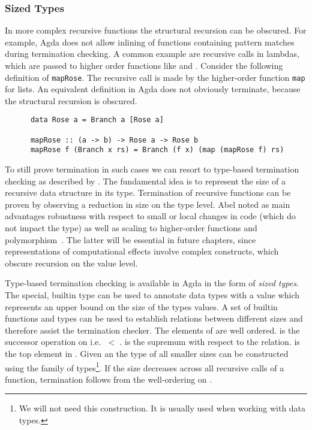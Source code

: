\subsubsection{Sized Types}
\label{preliminaries:sized-types}

In more complex recursive functions the structural recursion can be obscured.
For example, Agda does not allow inlining of functions containing pattern
matches during termination checking.
A common example are recursive calls in lambdas, which are passed to higher
order functions like  and \AgdaFunction{>>=}.
Consider the following definition of \texttt{mapRose}.
The recursive call is made by the higher-order function
\texttt{map} for lists.
An equivalent definition in Agda does not obviously terminate, because the
structural recursion is obscured.

\begin{verbatim}
      data Rose a = Branch a [Rose a]

      mapRose :: (a -> b) -> Rose a -> Rose b
      mapRose f (Branch x rs) = Branch (f x) (map (mapRose f) rs)
\end{verbatim}
To still prove termination in such cases we can resort to type-based
termination checking as described by \textcite{DBLP:journals/lmcs/Abel08}.
The fundamental idea is to represent the size of a recursive data structure in
its type.
Termination of recursive functions can be proven by observing a reduction in
size on the type level.
Abel noted as main advantages robustness with respect to small or local changes
in code (which do not impact the type) as well as scaling to higher-order
functions and polymorphism~\cite{DBLP:journals/lmcs/Abel08}.
The latter will be essential in future chapters, since representations of
computational effects involve complex constructs, which obscure recursion on the
value level.

Type-based termination checking is available in Agda in the form of
\textit{sized types}.
The special, builtin type  can be used to annotate data types
with a value which represents an upper bound on the size of the types values.
A set of builtin functions and types can be used to establish relations between
different sizes and therefore assist the termination checker.
The elements of  are well ordered.
 is the successor operation on  i.e. 
$\;<\;$\AgdaSpace{}.
 is the supremum with respect to the relation.
 is the top element in .
Given an  the type of all smaller sizes can be constructed using
the  family of types\footnote{We will not need this
  construction. It is usually used when working with 
  data types.}.
If the size decreases across all recursive calls of a function, termination
follows from the well-ordering on .

